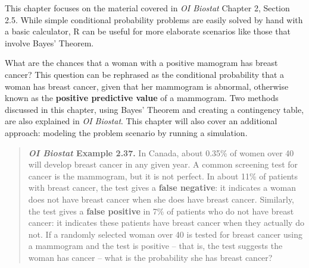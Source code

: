 \documentclass{report}\usepackage[]{graphicx}\usepackage[]{color}
\begin{document}
\vspace{0.5cm} 

This chapter focuses on the material covered in \textit{OI Biostat} Chapter 2, Section 2.5. While simple conditional probability problems are easily solved by hand with a basic calculator, \textsf{R} can be useful for more elaborate scenarios like those that involve Bayes' Theorem.

What are the chances that a woman with a positive mamogram has breast cancer? This question can be rephrased as the conditional probability that a woman has breast cancer, given that her mammogram is abnormal, otherwise known as the \textbf{positive predictive value} of a mammogram. Two methods discussed in this chapter, using Bayes' Theorem and creating a contingency table, are also explained in \textit{OI Biostat}. This chapter will also cover an additional approach: modeling the problem scenario by running a simulation.

\begin{quotation}

\textbf{\textit{OI Biostat} Example 2.37.} In Canada, about 0.35\% of women over 40 will develop breast cancer in any given year. A common screening test for cancer is the mammogram, but it is not perfect. In about 11\% of patients with breast cancer, the test gives a \textbf{false negative}: it indicates a woman does not have breast cancer when she does have breast cancer. Similarly, the test gives a \textbf{false positive} in 7\% of patients who do not have breast cancer: it indicates these patients have breast cancer when they actually do not. If a randomly selected woman over 40 is tested for breast cancer using a mammogram and the test is positive -- that is, the test suggests the woman has cancer -- what is the probability she has breast cancer?

\end{quotation}


\end{document}
